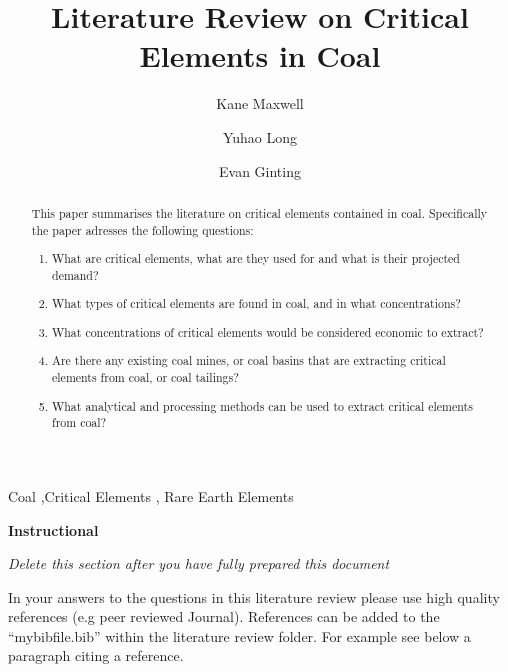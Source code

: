 \documentclass[preprint, 3p,
authoryear]{elsarticle} %
\begin{document}
\begin{frontmatter}

  \title{Literature Review on Critical Elements in Coal}
    \author[Matrix Geoscience]{Kane Maxwell%
  }
    \author[Monash University]{Yuhao Long%
  }
    \author[Monash University]{Evan Ginting%
  }
  
  \begin{abstract}
  This paper summarises the literature on critical elements contained in
  coal. Specifically the paper adresses the following questions:

  \begin{enumerate}
  \def\labelenumi{\arabic{enumi})}
  \item
    What are critical elements, what are they used for and what is their
    projected demand?
  \item
    What types of critical elements are found in coal, and in what
    concentrations?
  \item
    What concentrations of critical elements would be considered
    economic to extract?
  \item
    Are there any existing coal mines, or coal basins that are
    extracting critical elements from coal, or coal tailings?
  \item
    What analytical and processing methods can be used to extract
    critical elements from coal?
  \end{enumerate}
  \end{abstract}
    \begin{keyword}
    Coal \sep Critical Elements \sep 
    Rare Earth Elements
  \end{keyword}
  
 \end{frontmatter}

\textbf{Instructional}

\emph{Delete this section after you have fully prepared this document}

In your answers to the questions in this literature review please use
high quality references (e.g peer reviewed Journal). References can be
added to the ``mybibfile.bib'' within the literature review folder. For
example see below a paragraph citing a reference.
\end{document}
